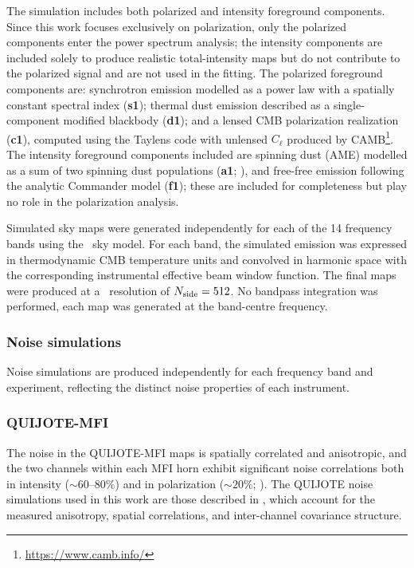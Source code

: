 The simulation includes both polarized and intensity foreground components. Since this work focuses exclusively on polarization, only the polarized components enter the power spectrum analysis; the intensity components are included solely to produce realistic total-intensity maps but do not contribute to the polarized signal and are not used in the fitting. The polarized foreground components are: synchrotron emission modelled as a power law with a spatially constant spectral index (\textbf{s1}); thermal dust emission described as a single-component modified blackbody (\textbf{d1}); and a lensed CMB polarization realization (\textbf{c1}), computed using the Taylens code \citep{Taylens} with unlensed $C_\ell$ produced by CAMB\footnote{\url{https://www.camb.info/}}. The intensity foreground components included are spinning dust (AME) modelled as a sum of two spinning dust populations (\textbf{a1}; \citealt{Planck_2015X}), and free-free emission following the analytic Commander model (\textbf{f1}); these are included for completeness but play no role in the polarization analysis.

Simulated sky maps were generated independently for each of the 14 frequency bands using the \pysm\ sky model. For each band, the simulated emission was expressed in thermodynamic CMB temperature units and convolved in harmonic space with the corresponding instrumental effective beam window function. The final maps were produced at a \healpix\ resolution of $N_{\rm side} = 512$. No bandpass integration was performed, each map was generated at the band-centre frequency.

\subsubsection{Noise simulations}
\label{sec:noise_simulations}

Noise simulations are produced independently for each frequency band and experiment, reflecting the distinct noise properties of each instrument.

\subsubsection*{QUIJOTE-MFI}

The noise in the QUIJOTE-MFI maps is spatially correlated and anisotropic, and the two channels within each MFI horn exhibit significant noise correlations both in intensity ($\sim 60$--$80\%$) and in polarization ($\sim 20\%$; \citealt{QUIJOTE_IV}). The QUIJOTE noise simulations used in this work are those described in \citet{QUIJOTE_IV}, which account for the measured anisotropy, spatial correlations, and inter-channel covariance structure.

